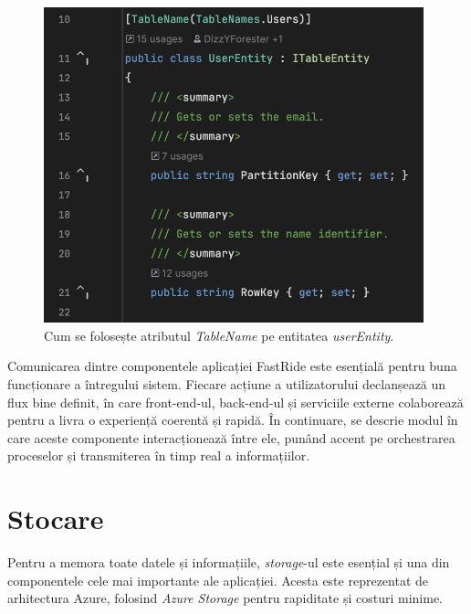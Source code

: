 \begin{figure}[H]
    \centering
    \includegraphics[width=11cm]{Assets/userEntity.png}
    \caption{Cum se folosește atributul \textit{TableName} pe entitatea \textit{userEntity}.}
    \label{fig:userEntity}
\end{figure}

Comunicarea dintre componentele aplicației FastRide este esențială pentru buna funcționare a întregului sistem. 
Fiecare acțiune a utilizatorului declanșează un flux bine definit, în care front-end-ul, back-end-ul și serviciile 
externe colaborează pentru a livra o experiență coerentă și rapidă. În continuare, se descrie modul în care aceste 
componente interacționează între ele, punând accent pe orchestrarea proceselor și transmiterea în timp real a 
informațiilor.

\section{Stocare}

Pentru a memora toate datele și informațiile, \textit{storage}-ul este esențial și una din componentele cele mai importante ale aplicației.
Acesta este reprezentat de arhitectura Azure, folosind \textit{Azure Storage} pentru rapiditate și costuri minime.

